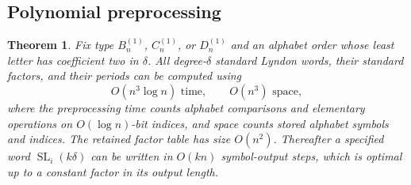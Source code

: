 \documentclass[11pt]{amsart}
\numberwithin{equation}{section}
\newtheorem{theorem}{Theorem}[section]
\theoremstyle{definition}
\DeclareMathOperator{\SL}{SL}
\begin{document}
\subsection{Polynomial preprocessing}
\begin{theorem}\label{thm:algorithm}
Fix type $B_n^{(1)}$, $C_n^{(1)}$, or $D_n^{(1)}$ and an alphabet order whose least letter has coefficient two in $\delta$. All degree-$\delta$ standard Lyndon words, their standard factors, and their periods can be computed using
\[
 O(n^3\log n)\text{ time},\qquad O(n^3)\text{ space},
\]
where the preprocessing time counts alphabet comparisons and elementary operations on $O(\log n)$-bit indices, and space counts stored alphabet symbols and indices. The retained factor table has size $O(n^2)$. Thereafter a specified word $\SL_i(k\delta)$ can be written in $O(kn)$ symbol-output steps, which is optimal up to a constant factor in its output length.
\end{theorem}
\end{document}
